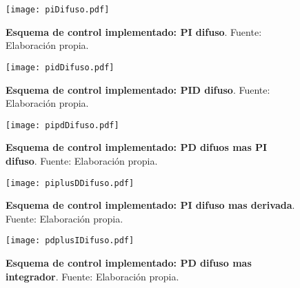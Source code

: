     \vfill

    \begin{figure}[htb]
        \centering
        \texttt{[image: piDifuso.pdf]}
        \caption[Esquema de control implementado: PI difuso]{\textbf{Esquema de control implementado: PI difuso}. Fuente: Elaboración propia.} 
        \label{fig:piDifuso}
    \end{figure}

    \vfill

    \begin{figure}[htb]
        \centering
        \texttt{[image: pidDifuso.pdf]}
        \caption[Esquema de control implementado: PID difuso]{\textbf{Esquema de control implementado: PID difuso}. Fuente: Elaboración propia.} 
        \label{fig:pidDifuso}
    \end{figure}
    
    \vfill

    \pagebreak
    
    \vfill

    \begin{figure}[htb]
        \centering
        \texttt{[image: pipdDifuso.pdf]}
        \caption[Esquema de control implementado: PD difuos mas PI difuso]{\textbf{Esquema de control implementado: PD difuos mas PI difuso}. Fuente: Elaboración propia.} 
        \label{fig:pipdDifuso}
    \end{figure}
    
    \vfill

    \begin{figure}[htb]
        \centering
        \texttt{[image: piplusDDifuso.pdf]}
        \caption[Esquema de control implementado: PI difuso mas derivada]{\textbf{Esquema de control implementado: PI difuso mas derivada}. Fuente: Elaboración propia.} 
        \label{fig:piplusDDifuso}
    \end{figure}
    
    \vfill

    \begin{figure}[htb]
        \centering
        \texttt{[image: pdplusIDifuso.pdf]}
        \caption[Esquema de control implementado: PD difuso mas integrador]{\textbf{Esquema de control implementado: PD difuso mas integrador}. Fuente: Elaboración propia.} 
        \label{fig:pdplusIDifuso}
    \end{figure}
    
    \vfill

